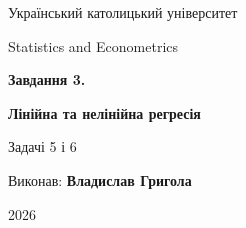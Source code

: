 \documentclass[11pt,a4paper]{article}
\begin{document}
\hypersetup{pageanchor=false}
\begin{titlepage}
\centering
\vspace*{14mm}
{\Large Український католицький університет\par}
\vspace{9mm}
{\large Statistics and Econometrics\par}
\vfill
{\huge\bfseries\color{accent} Завдання 3.\par}
\vspace{4mm}
{\huge\bfseries\color{accent} Лінійна та нелінійна регресія\par}
\vspace{10mm}
{\large Задачі 5 і 6\par}
\vfill
{\large Виконав: \textbf{Владислав Григола}\par}
\vspace{22mm}
{\large 2026\par}
\end{titlepage}
\hypersetup{pageanchor=true}
\tableofcontents
\clearpage


\end{document}
